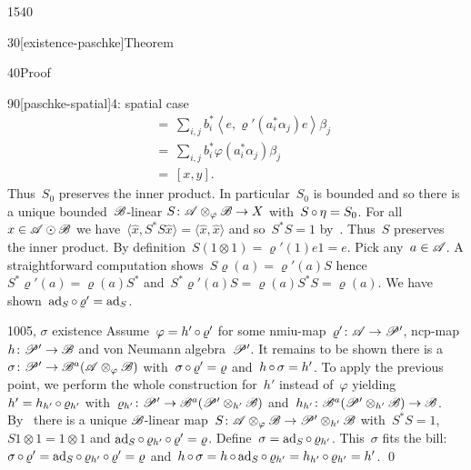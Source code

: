 \begin{parsec}{1540}
\begin{point}{30}[existence-paschke]{Theorem}
\begin{point}{40}{Proof}
\begin{point}{90}[paschke-spatial]{4: spatial case}
\begin{align*}
    & \ =\ \sum_{i,j} b_i^*\left<e,  \varrho'(a_i^*\alpha_j)e \right>\beta_j \\
    & \ =\ \sum_{i,j} b_i^* \varphi(a_i^*\alpha_j) \beta_j \\
    & \ =\ [x,y].
\end{align*}
Thus~$S_0$ preserves the inner product. In particular~$S_0$ is bounded
    and so there is a unique bounded~$\mathscr{B}$-linear
    $S \colon \mathscr{A} \otimes_\varphi \mathscr{B} \to X$
    with~$S \mathop{\circ} \eta = S_0$.
    For all~$x \in \mathscr{A} \odot \mathscr{B}$
        we have~$\langle \hat{x}, S^*S \hat{x}\rangle = \langle \hat{x}, \hat{x} \rangle$
    and so~$S^*S=1$
    by~.
Thus~$S$ preserves the inner product.
By definition~$S (1\otimes1) = \varrho'(1)e 1 = e$.
Pick any~$a \in \mathscr{A}$.
A straightforward computation shows~$S \varrho(a) = \varrho'(a) S$
hence~$S^* \varrho'(a) = \varrho(a) S^*$
and~$S^* \varrho'(a) S =  \varrho(a) S^*S= \varrho(a)$.
We have shown~$\mathrm{ad}_S \mathop{\circ} \varrho' = \mathrm{ad}_S$.
\end{point}
\begin{point}{100}{5, $\sigma$ existence}
Assume~$\varphi = h' \mathop{\circ} \varrho'$
    for some nmiu-map~$\varrho'\colon \mathscr{A} \to \mathscr{P}'$,
        ncp-map~$h\colon \mathscr{P}' \to \mathscr{B}$
        and von Neumann algebra~$\mathscr{P}'$.
It remains to be shown there is a ~$\sigma\colon \mathscr{P}' \to \mathscr{B}^a(\mathscr{A}\otimes_\varphi\mathscr{B})$
with~$\sigma\mathop{\circ}\varrho'=\varrho$ and~$h \mathop{\circ} \sigma = h'$.
To apply the previous point,
    we perform the whole construction for~$h'$ instead of~$\varphi$
    yielding
    $h' = h_{h'} \mathop{\circ} \varrho_{h'}$
    with~$\varrho_{h'} \colon \mathscr{P}' \to \mathscr{B}^a (\mathscr{P}' \otimes_{h'} \mathscr{B})$
    and~$h_{h'} \colon \mathscr{B}^a(\mathscr{P}' \otimes_{h'} \mathscr{B}) \to \mathscr{B}$.
By~
    there is a unique 
    $\mathscr{B}$-linear map~$S\colon \mathscr{A} \otimes_{\varphi} \mathscr{B} \to
                                \mathscr{P}' \otimes_{h'} \mathscr{B}$
with~$S^*S = 1$, $S 1\otimes1 = 1\otimes1$ and
$\mathrm{ad}_S \mathop{\circ} \varrho_{h'}\mathop{\circ} \varrho' = \varrho$.
Define~$\sigma = \mathrm{ad}_S \mathop{\circ} \varrho_{h'}$.
This~$\sigma$ fits the bill:
$\sigma \mathop{\circ} \varrho' = \mathrm{ad}_S \mathop{\circ} \varrho_{h'} \mathop{\circ} \varrho'
                                = \varrho$
and~$h \mathop{\circ} \sigma = h \mathop{\circ} \mathrm{ad}_S \mathop{\circ} \varrho_{h'}
= h_{h'} \mathop{\circ} \varrho_{h'} = h'$. \qed
\end{point}
\end{point}
\end{point}
\end{parsec}

